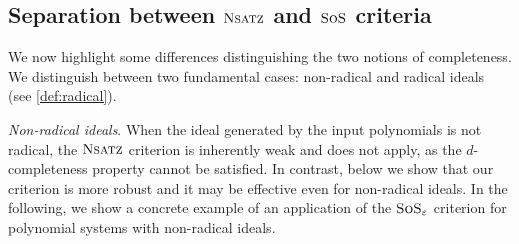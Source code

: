 \documentclass[11pt]{article}
\newcommand{\sos}{\text{\sc{SoS}}}
\newcommand{\Nsatz}{\textsc{Nsatz}}
\newcommand{\1}{\textbf{1}}
\begin{document}
\subsection[Separation between Nsatz and SoS]{Separation between $\Nsatz$ and $\sos$ criteria}\label{sect:separation_Nsatz_SOS}


We now highlight some differences distinguishing the two notions of completeness. We distinguish between two fundamental cases: non-radical and radical ideals (see \cref{def:radical}).

\textit{Non-radical ideals}. When the ideal generated by the input polynomials is not radical, the $\Nsatz$ criterion is inherently weak and does not apply, as the $d$-completeness property cannot be satisfied. In contrast, below we show that our criterion is more robust and it may be effective even for non-radical ideals. 
In the following, we show a concrete example of an application of the $\sos_{\varepsilon}$ criterion for polynomial systems with non-radical ideals.
\end{document}
